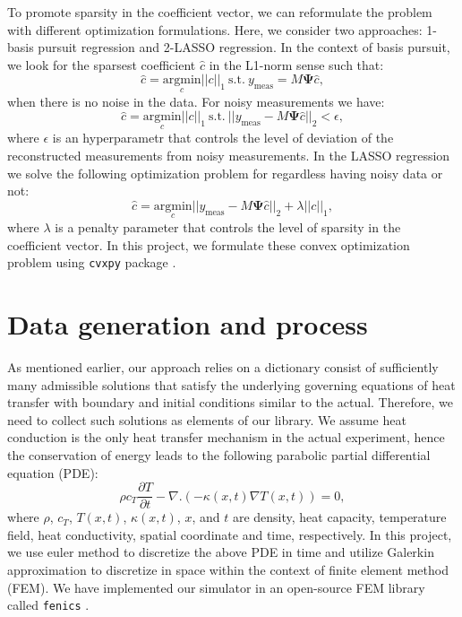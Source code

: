 \documentclass[conference]{IEEEtran}
\begin{document}
To promote sparsity in the coefficient vector, we can reformulate the problem with different optimization formulations. Here, we consider two approaches: 1-basis pursuit regression and 2-LASSO regression. In the context of basis pursuit, we look for the sparsest coefficient $\hat{c}$ in the L1-norm sense such that:
\begin{equation}
\hat{c} = \underset{c}{\text{argmin}} ||c||_1 \ \text{s.t.} \ y_{\text{meas}} = M\mathbf{\Psi}\hat{c}, 
\end{equation}
when there is no noise in the data. For noisy measurements we have:
\begin{equation}
\hat{c} = \underset{c}{\text{argmin}} ||c||_1 \ \text{s.t.} \ ||y_{\text{meas}}-M\mathbf{\Psi}\hat{c}||_2 < \epsilon, 
\end{equation}
where $\epsilon$ is an hyperparametr that controls the level of deviation of the reconstructed measurements from noisy measurements. In the LASSO regression we solve the following optimization problem for regardless having noisy data or not:
\begin{equation}
\hat{c} = \underset{c}{\text{argmin}}  ||y_{\text{meas}}-M\mathbf{\Psi}\hat{c}||_2 + \lambda ||c||_1,
\end{equation}
where $\lambda$ is a penalty parameter that controls the level of sparsity in the coefficient vector. In this project, we formulate these convex optimization problem using \texttt{cvxpy} package \cite{Diamond2016}.

\section{Data generation and process}
As mentioned earlier, our approach relies on a dictionary consist of sufficiently many admissible solutions that satisfy the underlying governing equations of heat transfer with boundary and initial conditions similar to the actual. Therefore, we need to collect such solutions as elements of our library.  We assume heat conduction is the only heat transfer mechanism in the actual experiment, hence the conservation of energy leads to the following parabolic partial differential equation (PDE):
\begin{equation}
\rho c_T \frac{\partial T}{\partial t} - \nabla . (-\kappa(x,t) \nabla T(x,t)) =0,
\end{equation}
where $\rho$, $c_T$, $T(x,t)$, $\kappa(x,t)$, $x$, and $t$ are density, heat capacity, temperature field, heat conductivity, spatial coordinate and time, respectively. In this project, we use euler method to discretize the above PDE in time and utilize Galerkin approximation to discretize in space within the context of finite element method (FEM). We have implemented our simulator in an open-source FEM library called \texttt{fenics} \cite{Alnaes2015}.
\end{document}

